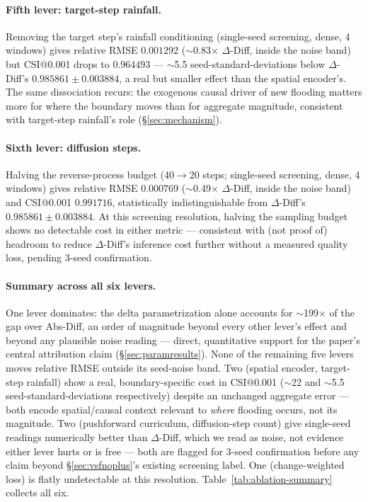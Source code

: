 \documentclass[11pt]{article}
\newcommand{\ours}{\mbox{$\Delta$-Diff}}
\newcommand{\absdiff}{\mbox{Abs-Diff}}
\begin{document}
\paragraph{Fifth lever: target-step rainfall.} Removing the target
step's rainfall conditioning (single-seed screening, dense, 4 windows)
gives relative RMSE $0.001292$ ($\sim$0.83$\times$ \ours{}, inside the
noise band) but CSI@0.001 drops to $0.964493$ --- $\sim$5.5
seed-standard-deviations below \ours{}'s $0.985861\pm0.003884{}$, a
real but smaller effect than the spatial encoder's. The same
dissociation recurs: the exogenous causal driver of new flooding
matters more for where the boundary moves than for aggregate
magnitude, consistent with target-step rainfall's role (\S\ref{sec:mechanism}).

\paragraph{Sixth lever: diffusion steps.} Halving the reverse-process
budget (40$\to$20 steps; single-seed screening, dense, 4 windows) gives
relative RMSE $0.000769$ ($\sim$0.49$\times$ \ours{}, inside the noise
band) and CSI@0.001 $0.991716$, statistically indistinguishable from
\ours{}'s $0.985861\pm0.003884$. At this screening resolution, halving
the sampling budget shows no detectable cost in either metric ---
consistent with (not proof of) headroom to reduce \ours{}'s inference
cost further without a measured quality loss, pending 3-seed
confirmation.

\paragraph{Summary across all six levers.} One lever dominates: the
delta parametrization alone accounts for $\sim$199$\times$ of the gap
over \absdiff{}, an order of magnitude beyond every other lever's
effect and beyond any plausible noise reading --- direct, quantitative
support for the paper's central attribution claim
(\S\ref{sec:paramresults}). None of the remaining five levers moves
relative RMSE outside its seed-noise band. Two (spatial encoder,
target-step rainfall) show a real, boundary-specific cost in CSI@0.001
($\sim$22 and $\sim$5.5 seed-standard-deviations respectively) despite
an unchanged aggregate error --- both encode spatial/causal context
relevant to \emph{where} flooding occurs, not its magnitude. Two
(pushforward curriculum, diffusion-step count) give single-seed
readings numerically better than \ours{}, which we read as noise, not
evidence either lever hurts or is free --- both are flagged for 3-seed
confirmation before any claim beyond \S\ref{sec:vsfnoplus}'s existing
screening label. One (change-weighted loss) is flatly undetectable at
this resolution. Table~\ref{tab:ablation-summary} collects all six.
\end{document}
